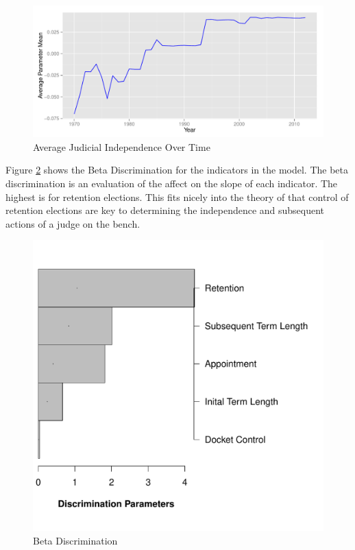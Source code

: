 \documentclass[12pt]{article}
\begin{document}
\begin{figure}[!tbh]
\centering
\caption{Average Judicial Independence Over Time}
\label{fig:meanavgtime}
\includegraphics[width=0.7\linewidth]{graphics/fiveind/meanavgtime}
\end{figure}

Figure \ref{fig:FiveBetaDiscrimination} shows the Beta Discrimination for the indicators in the model.  The beta discrimination is an evaluation of the affect on the slope of each indicator.  The highest is for retention elections.  This fits nicely into the theory of \citet{Choi2010} that control of retention elections are key to determining the independence and subsequent actions of a judge on the bench.

\begin{figure}[!tbh]
\centering
\caption{Beta Discrimination}
\label{fig:FiveBetaDiscrimination}
\includegraphics[width=0.7\linewidth]{graphics/fiveind/FiveBetaDiscrimination}
\end{figure}
\end{document}
